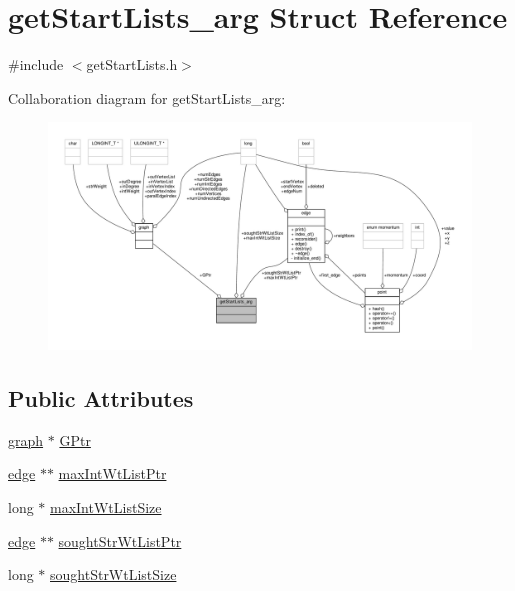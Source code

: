 \hypertarget{structgetStartLists__arg}{\section{get\-Start\-Lists\-\_\-arg Struct Reference}
\label{structgetStartLists__arg}
}


{\ttfamily \#include $<$get\-Start\-Lists.\-h$>$}



Collaboration diagram for get\-Start\-Lists\-\_\-arg\-:
\nopagebreak
\begin{figure}[H]
\begin{center}
\leavevmode
\includegraphics[width=350pt]{structgetStartLists__arg__coll__graph}
\end{center}
\end{figure}
\subsection*{Public Attributes}
\begin{DoxyCompactItemize}
\item 
\hyperlink{structgraph}{graph} $\ast$ \hyperlink{structgetStartLists__arg_ac2f21f016b832e7c550780bd67f7f738}{G\-Ptr}
\item 
\hyperlink{classedge}{edge} $\ast$$\ast$ \hyperlink{structgetStartLists__arg_a2070324e609fe5b291c21bc9799407e2}{max\-Int\-Wt\-List\-Ptr}
\item 
long $\ast$ \hyperlink{structgetStartLists__arg_a4c719bd3316689a92c37818b32b342b2}{max\-Int\-Wt\-List\-Size}
\item 
\hyperlink{classedge}{edge} $\ast$$\ast$ \hyperlink{structgetStartLists__arg_aa464938f021ff7ceefa0863daa2f089c}{sought\-Str\-Wt\-List\-Ptr}
\item 
long $\ast$ \hyperlink{structgetStartLists__arg_a9cd84b200e7ad14ee9725f0f3cdb6a4c}{sought\-Str\-Wt\-List\-Size}
\end{DoxyCompactItemize}


